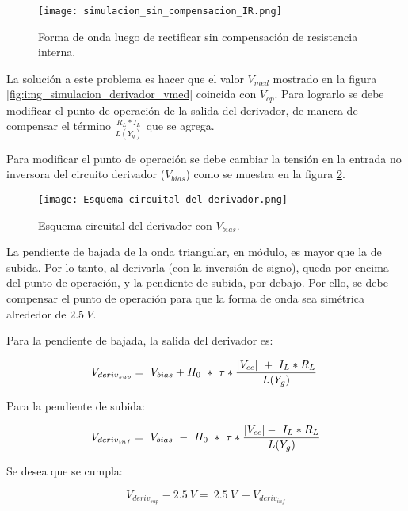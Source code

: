 \begin{figure}[H]
	\centering
	\texttt{[image: simulacion\_sin\_compensacion\_IR.png]}
	\caption{Forma de onda luego de rectificar sin compensación de resistencia interna.}
	\label{fig:img_simulacion_sin_compensacion_IR}
\end{figure}

La solución a este problema es hacer que el valor $V_{med}$ mostrado en la figura \ref{fig:img_simulacion_derivador_vmed} coincida con $V_{op}$. Para lograrlo se debe modificar el punto de operación de la salida del derivador, de manera de compensar el término $\frac{R_L*I_L}{L(Y_g)}$ que se agrega.

Para modificar el punto de operación se debe cambiar la tensión en la entrada no inversora del circuito derivador ($V_{bias}$) como se muestra en la figura \ref{fig:img_Esquema-circuital-del-derivador}. 

\begin{figure}[H]
	\centering
	\texttt{[image: Esquema-circuital-del-derivador.png]}
	\caption{Esquema circuital del derivador con $V_{bias}$.}
	\label{fig:img_Esquema-circuital-del-derivador}
\end{figure}

La pendiente de bajada de la onda triangular, en módulo, es mayor que la de subida. Por lo tanto, al derivarla (con la inversión de signo), queda por encima del punto de operación, y la pendiente de subida, por debajo. Por ello, se debe compensar el punto de operación para que la forma de onda sea simétrica alrededor de $2.5\:V$. 

Para la pendiente de bajada, la salida del derivador es:

\begin{equation} \label{eq_Vyf-Vbias}
	V_{deriv_{sup}} =\ V_{bias}+H_0\ *\ \tau *\frac{\abs{V_{cc}}\ +\ I_L*R_L}{L(Y_g)}\ 
\end{equation}

Para la pendiente de subida:

\begin{equation} \label{eq_Vyf-Vbias2}
	V_{deriv_{inf}} =\ V_{bias}\ -\ H_0\ *\ \tau *\frac{\abs{V_{cc}} -\ I_L*R_L}{L(Y_g)}
\end{equation}

Se desea que se cumpla:

\begin{equation} \label{eq_Vyf_Vbias3}
	V_{deriv_{sup}} -2.5\:V=\ 2.5\:V\ - V_{deriv_{inf}}
\end{equation}

